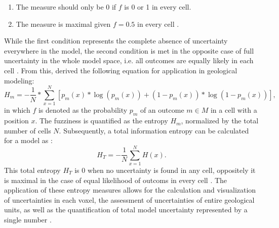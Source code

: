         \begin{enumerate}
	        \item The measure should only be 0 if $f$ is 0 or 1 in every cell.
	        \item The measure is maximal given $f = 0.5$ in every cell \citep{wellmann2012uncertainties}.
        \end{enumerate}
        While the first condition represents the complete absence of uncertainty everywhere in the model, the second condition is met in the opposite case of full uncertainty in the whole model space, i.e. all outcomes are equally likely in each cell \citep{schaaf2017}. From this, \citet{wellmann2012uncertainties} derived the following equation for application in geological modeling:
        \begin{equation}
	        H_m = -\frac{1}{N}*\sum_{x=1}^{N}[p_m(x)*\log(p_m(x))+(1-p_m(x))*\log(1-p_m(x))],
        \end{equation}
        in which $f$ is denoted as the probability $p_m$ of an outcome $m\in M$ in a cell with a position $x$. The fuzziness is quantified as the entropy $H_m$, normalized by the total number of cells $N$. Subsequently, a total information entropy can be calculated for a model as \citep{wellmann2012uncertainties}:
        \begin{equation}
	        H_T = -\frac{1}{N}\sum_{x=1}^{N}H(x).
        \end{equation}
        This total entropy $H_T$ is 0 when no uncertainty is found in any cell, oppositely it is maximal in the case of equal likelihood of outcoms in every cell \citep{wellmann2012uncertainties, schaaf2017}. The application of these entropy measures allows for the calculation and visualization of uncertainties in each voxel, the assessment of uncertainties of entire geological units, as well as the quantification of total model uncertainty represented by a single number \citep{wellmann2012uncertainties}.
        
